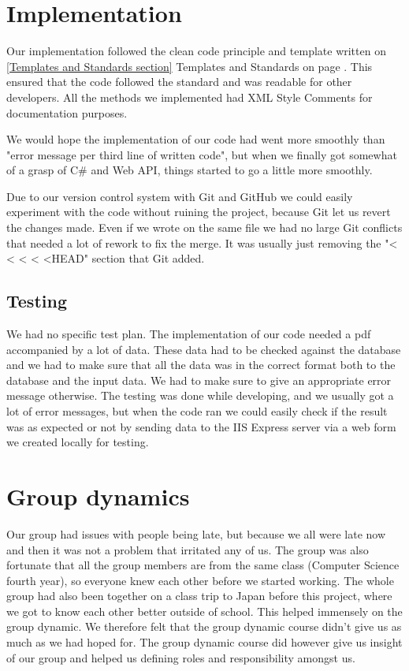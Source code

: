 \section{Implementation}
Our implementation followed the clean code principle and template written on \ref{Templates and Standards section} Templates and Standards on page \pageref{Templates and Standards section}. This ensured that the code followed the standard and was readable for other developers. All the methods we implemented had XML Style Comments for documentation purposes.

We would hope the implementation of our code had went more smoothly than "error message per third line of written code", but when we finally got somewhat of a grasp of C\# and Web API, things started to go a little more smoothly.

Due to our version control system with Git and GitHub we could easily experiment with the code without ruining the project, because Git let us revert the changes made. Even if we wrote on the same file we had no large Git conflicts that needed a lot of rework to fix the merge. It was usually just removing the "< < < < <HEAD" section that Git added.

\subsection{Testing}
We had no specific test plan. The implementation of our code needed a pdf accompanied by a lot of data. These data had to be checked against the database and we had to make sure that all the data was in the correct format both to the database and the input data. We had to make sure to give an appropriate error message otherwise. The testing was done while developing, and we usually got a lot of error messages, but when the code ran we could easily check if the result was as expected or not by sending data to the IIS Express server via a web form we created locally for testing.

\section{Group dynamics}
Our group had issues with people being late, but because we all were late now and then it was not a problem that irritated any of us. The group was also fortunate that all the group members are from the same class (Computer Science fourth year), so everyone knew each other before we started working. The whole group had also been together on a class trip to Japan before this project, where we got to know each other better outside of school. This helped immensely on the group dynamic. We therefore felt that the group dynamic course didn't give us as much as we had hoped for. The group dynamic course did however give us insight of our group and helped us defining roles and responsibility amongst us.



